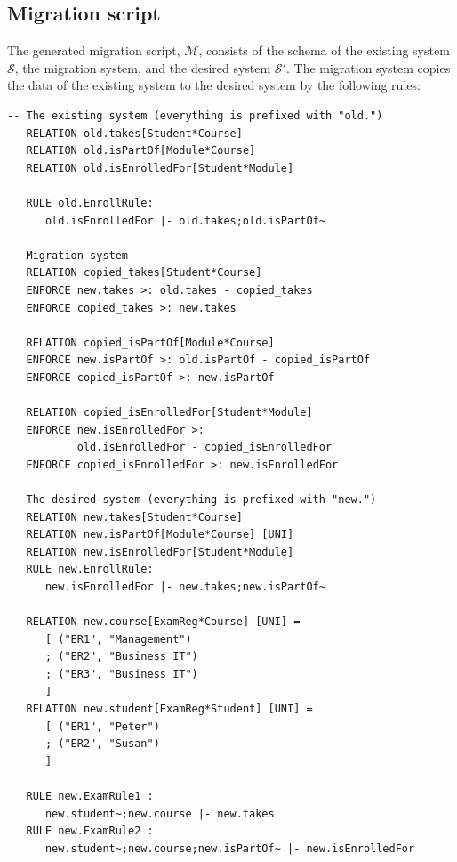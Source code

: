 \documentclass[runningheads]{llncs}
\newcommand{\migrsys}{\mathscr{M}}
\newcommand{\infsys}{\mathscr{S}}
\begin{document}
\subsection{Migration script}
   The generated migration script, $\migrsys$, consists of the schema of the existing system $\infsys$,
   the migration system, and the desired system $\infsys'$.
   The migration system copies the data of the existing system to the desired system by the following rules:
\begin{verbatim}
-- The existing system (everything is prefixed with "old.")
   RELATION old.takes[Student*Course]
   RELATION old.isPartOf[Module*Course]
   RELATION old.isEnrolledFor[Student*Module]

   RULE old.EnrollRule:
      old.isEnrolledFor |- old.takes;old.isPartOf~
      
-- Migration system
   RELATION copied_takes[Student*Course]
   ENFORCE new.takes >: old.takes - copied_takes
   ENFORCE copied_takes >: new.takes

   RELATION copied_isPartOf[Module*Course]
   ENFORCE new.isPartOf >: old.isPartOf - copied_isPartOf
   ENFORCE copied_isPartOf >: new.isPartOf

   RELATION copied_isEnrolledFor[Student*Module]
   ENFORCE new.isEnrolledFor >:
           old.isEnrolledFor - copied_isEnrolledFor
   ENFORCE copied_isEnrolledFor >: new.isEnrolledFor

-- The desired system (everything is prefixed with "new.")
   RELATION new.takes[Student*Course]
   RELATION new.isPartOf[Module*Course] [UNI]
   RELATION new.isEnrolledFor[Student*Module]
   RULE new.EnrollRule:
      new.isEnrolledFor |- new.takes;new.isPartOf~
      
   RELATION new.course[ExamReg*Course] [UNI] =
      [ ("ER1", "Management")
      ; ("ER2", "Business IT")
      ; ("ER3", "Business IT")
      ]
   RELATION new.student[ExamReg*Student] [UNI] =
      [ ("ER1", "Peter")
      ; ("ER2", "Susan")
      ]

   RULE new.ExamRule1 :
      new.student~;new.course |- new.takes
   RULE new.ExamRule2 :
      new.student~;new.course;new.isPartOf~ |- new.isEnrolledFor
\end{verbatim}
\end{document}
